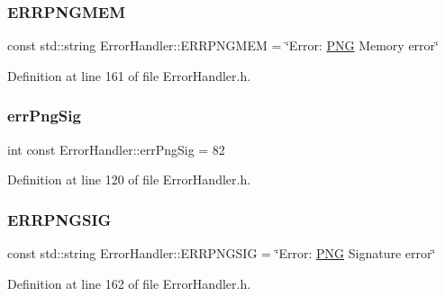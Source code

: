 \mbox{\label{classErrorHandler_adb02df3c256a08a19be5c1f5a0f3ca08}} 
\subsubsection{\texorpdfstring{ERRPNGMEM}{ERRPNGMEM}}
{\footnotesize\ttfamily const std\+::string Error\+Handler\+::\+E\+R\+R\+P\+N\+G\+M\+EM = \char`\"{}Error\+: \mbox{\hyperlink{constants_8h_afac9cfa577b92c66f46f7603f2f9fc14}{P\+NG}} Memory error\char`\"{}\hspace{0.3cm}{\ttfamily [static]}}



Definition at line 161 of file Error\+Handler.\+h.

\mbox{\label{classErrorHandler_a1b8c14322c54e4789f9d29503f939b5b}} 
\subsubsection{\texorpdfstring{errPngSig}{errPngSig}}
{\footnotesize\ttfamily int const Error\+Handler\+::err\+Png\+Sig = 82\hspace{0.3cm}{\ttfamily [static]}}



Definition at line 120 of file Error\+Handler.\+h.

\mbox{\label{classErrorHandler_ad7f59edda1a1c28958eced1bc8bdeab7}} 
\subsubsection{\texorpdfstring{ERRPNGSIG}{ERRPNGSIG}}
{\footnotesize\ttfamily const std\+::string Error\+Handler\+::\+E\+R\+R\+P\+N\+G\+S\+IG = \char`\"{}Error\+: \mbox{\hyperlink{constants_8h_afac9cfa577b92c66f46f7603f2f9fc14}{P\+NG}} Signature error\char`\"{}\hspace{0.3cm}{\ttfamily [static]}}



Definition at line 162 of file Error\+Handler.\+h.

